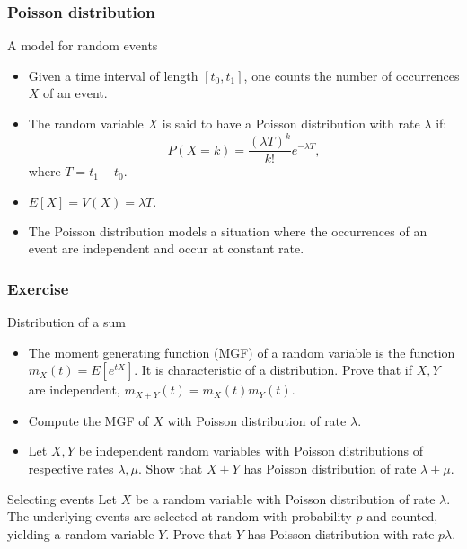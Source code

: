 \documentclass[main.tex]{subfiles}
\begin{document}
\begin{frame}
    \frametitle{Poisson distribution}
\begin{block}{A model for random events}
   \begin{itemize}
    \item<+-> Given a time interval of length $\left[ t_0, t_1 \right]$, one counts the number of occurrences $X$ of an event.
    \item<+-> The random variable $X$ is said to have a Poisson distribution with rate $\lambda$ if:
    \begin{equation}
        P\left( X=k \right) = \frac{\left( \lambda T \right)^k}{k!} e^{-\lambda T},
    \end{equation}
    where $T=t_1-t_0.$
    \item<+-> $E\left[ X \right] = V(X)= \lambda T.$
    \item<+-> The Poisson distribution models a situation where the occurrences of an event are independent and occur at constant rate.
   \end{itemize} 

\end{block}
\end{frame}

\begin{frame}
    \frametitle{Exercise}
\begin{block}{Distribution of a sum}
    \begin{itemize}
        \item<+-> The moment generating function (MGF) of a random variable is the function $m_X(t)=E\left[ e^{tX} \right].$ It is
        characteristic of a distribution.  Prove that if $X,Y$ are independent, $m_{X+Y}(t)=m_X(t)m_Y(t).$
        \item<+-> Compute the MGF of $X$ with Poisson distribution of rate $\lambda.$
        \item<+-> Let $X,Y$ be independent random variables with Poisson distributions of respective rates $\lambda,\mu.$ 
        Show that $X+Y$ has Poisson distribution of rate $\lambda+\mu.$
    \end{itemize}
\end{block}
\begin{block}{Selecting events}
    Let $X$ be a random variable with Poisson distribution of rate $\lambda$. The underlying events are selected at random
    with probability $p$ and counted, yielding a random variable $Y$. Prove that $Y$ has Poisson distribution with rate $p \lambda.$
\end{block}    

\end{frame}
\end{document}
